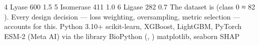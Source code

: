 {}\markdownRendererPipe{} 4 \markdownRendererPipe{} Lyase \markdownRendererPipe{} 600 \markdownRendererPipe{} 1.5 \markdownRendererPercentSign{} \markdownRendererPipe{}\markdownRendererSoftLineBreak
{}\markdownRendererPipe{} 5 \markdownRendererPipe{} Isomerase \markdownRendererPipe{} 411 \markdownRendererPipe{} 1.0 \markdownRendererPercentSign{} \markdownRendererPipe{}\markdownRendererSoftLineBreak
{}\markdownRendererPipe{} 6 \markdownRendererPipe{} Ligase \markdownRendererPipe{} 282 \markdownRendererPipe{} 0.7 \markdownRendererPercentSign{} \markdownRendererPipe{}\markdownRendererSoftLineBreak
{}\markdownRendererPipe{}  \markdownRendererPipe{} \markdownRendererPipe{}  \markdownRendererPipe{} \markdownRendererStrongEmphasis{100 \markdownRendererPercentSign{}} \markdownRendererPipe{}\markdownRendererParagraphSeparator
{}The dataset is  (class 0 ≈ 82 \markdownRendererPercentSign{}). Every design decision —\markdownRendererSoftLineBreak
{}loss weighting, oversampling, metric selection — accounts for this.\markdownRendererInterblockSeparator
{}\markdownRendererSectionBegin
{}\markdownRendererInterblockSeparator
{}\markdownRendererUlBeginTight
\markdownRendererUlItem {} Python 3.10+\markdownRendererUlItemEnd 
\markdownRendererUlItem {} scikit-learn, XGBoost, LightGBM, PyTorch\markdownRendererUlItemEnd 
\markdownRendererUlItem {} ESM-2 (Meta AI) via the  library\markdownRendererUlItemEnd 
\markdownRendererUlItem {} BioPython (, )\markdownRendererUlItemEnd 
\markdownRendererUlItem {} matplotlib, seaborn\markdownRendererUlItemEnd 
\markdownRendererUlItem {} SHAP\markdownRendererUlItemEnd 
\markdownRendererUlEndTight \markdownRendererInterblockSeparator
{}\markdownRendererThematicBreak{}\markdownRendererInterblockSeparator
{}
\markdownRendererSectionEnd 
\markdownRendererSectionEnd \markdownRendererSectionBegin
{}\markdownRendererInterblockSeparator
{}\markdownRendererSectionBegin
{}\markdownRendererInterblockSeparator

